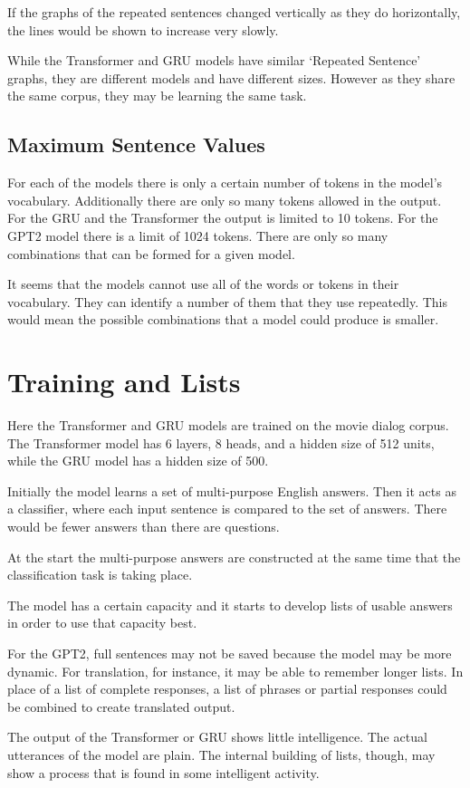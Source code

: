 If the graphs of the repeated sentences changed vertically as they do horizontally, the lines would be shown to increase very slowly.

While the Transformer and GRU models have similar `Repeated Sentence' graphs, they are different models and have different sizes. 
However as they share the same corpus, they may be learning the same task.

\subsection{Maximum Sentence Values}

For each of the models there is only a certain number of tokens in the model's vocabulary. Additionally there are only so many tokens allowed in the output. For the GRU and the Transformer the output is limited to 10 tokens. For the GPT2 model there is a limit of 1024 tokens. There are only so many combinations that can be formed for a given model.

It seems that the models cannot use all of the words or tokens in their vocabulary. They can identify a number of them that they use repeatedly. This would mean the possible combinations that a model could produce is smaller.

\section{Training and Lists}

Here the Transformer and GRU models are trained on the movie dialog corpus. The Transformer model has 6 layers, 8 heads, and a hidden size of 512 units, while the GRU model has a hidden size of 500.

Initially the model learns a set of multi-purpose English answers. Then it acts as a classifier, where each input sentence is compared to the set of answers. There would be fewer answers than there are questions. 

At the start the multi-purpose answers are constructed at the same time that the classification task is taking place. 

The model has a certain capacity and it starts to develop lists of usable answers in order to use that capacity best.

For the GPT2, full sentences may not be saved because the model may be more dynamic. For translation, for instance, it may be able to remember longer lists. In place of a list of complete responses, a list of phrases or partial responses could be combined to create translated output.

The output of the Transformer or GRU shows little intelligence. The actual utterances of the model are plain. The internal building of lists, though, may show a process that is found in some intelligent activity.